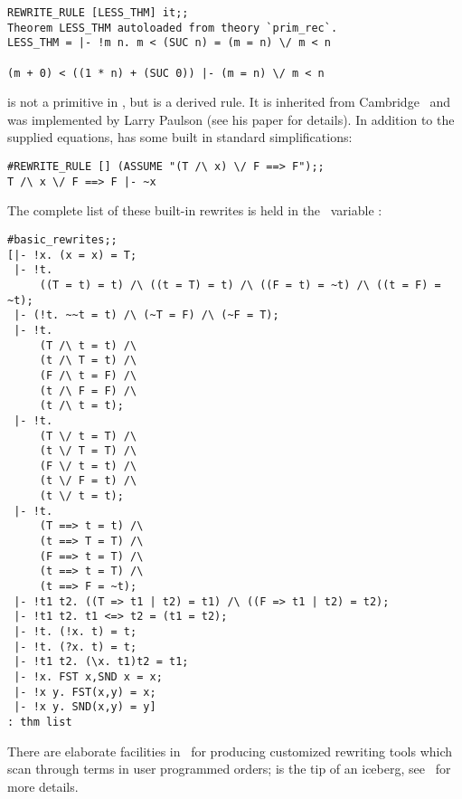 \begin{session}\begin{verbatim}
REWRITE_RULE [LESS_THM] it;;
Theorem LESS_THM autoloaded from theory `prim_rec`.
LESS_THM = |- !m n. m < (SUC n) = (m = n) \/ m < n

(m + 0) < ((1 * n) + (SUC 0)) |- (m = n) \/ m < n
\end{verbatim}\end{session}

 is not a primitive in \HOL, but is a derived rule. It is
inherited from Cambridge \LCF\ and was implemented by Larry Paulson (see
his paper \cite{lcp_rewrite} for details). In addition to the supplied equations,
 has some built in standard simplifications:

\begin{session}\begin{verbatim}
#REWRITE_RULE [] (ASSUME "(T /\ x) \/ F ==> F");;
T /\ x \/ F ==> F |- ~x
\end{verbatim}\end{session}

\noindent The complete list of these built-in rewrites is 
held in the \ML\ variable :

\newpage %

\begin{session}\begin{verbatim}
#basic_rewrites;;
[|- !x. (x = x) = T;
 |- !t.
     ((T = t) = t) /\ ((t = T) = t) /\ ((F = t) = ~t) /\ ((t = F) = ~t);
 |- (!t. ~~t = t) /\ (~T = F) /\ (~F = T);
 |- !t.
     (T /\ t = t) /\
     (t /\ T = t) /\
     (F /\ t = F) /\
     (t /\ F = F) /\
     (t /\ t = t);
 |- !t.
     (T \/ t = T) /\
     (t \/ T = T) /\
     (F \/ t = t) /\
     (t \/ F = t) /\
     (t \/ t = t);
 |- !t.
     (T ==> t = t) /\
     (t ==> T = T) /\
     (F ==> t = T) /\
     (t ==> t = T) /\
     (t ==> F = ~t);
 |- !t1 t2. ((T => t1 | t2) = t1) /\ ((F => t1 | t2) = t2);
 |- !t1 t2. t1 <=> t2 = (t1 = t2);
 |- !t. (!x. t) = t;
 |- !t. (?x. t) = t;
 |- !t1 t2. (\x. t1)t2 = t1;
 |- !x. FST x,SND x = x;
 |- !x y. FST(x,y) = x;
 |- !x y. SND(x,y) = y]
: thm list
\end{verbatim}\end{session}

There are elaborate facilities in \HOL\ for producing customized rewriting tools
which scan through terms in user programmed orders;  is the tip
of an iceberg, see \DESCRIPTION\ for more details.



